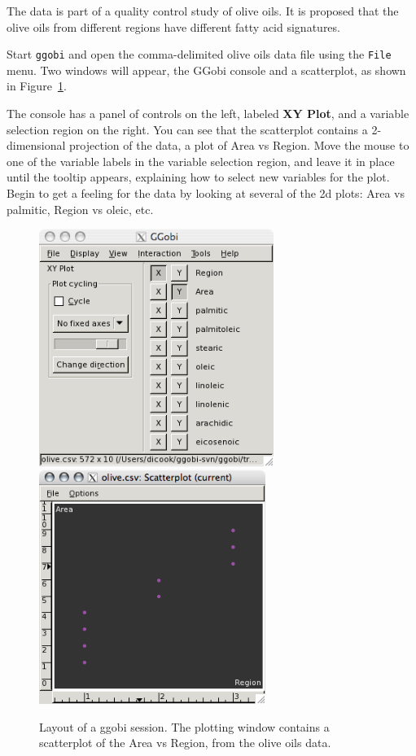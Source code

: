 \documentclass[11pt]{article}
\def\Widget#1{\textbf{#1}}
\begin{document}
The data is part of a quality control study of olive oils. It is proposed
that the olive oils from different regions have different fatty acid
signatures.

Start {\tt ggobi} and open the comma-delimited olive oils data file
using the {\tt File} menu.
Two windows will appear, the GGobi console
and a scatterplot, as shown in Figure~\ref{fig1}.

The console has a panel of controls on the left, labeled
\Widget{XY Plot}, and a variable selection region on the right.  You
can see that the scatterplot contains a 2-dimensional projection of
the data, a plot of Area vs Region.  Move the mouse to one of the
variable labels in the variable selection region, and leave it in
place until the tooltip appears, explaining how to select new
variables for the plot.  Begin to get a feeling for the data by
looking at several of the 2d plots: Area vs palmitic, Region vs oleic,
etc.

\begin{figure}[h]
\centerline{\includegraphics[width=3in]{Figures/olive1.png}
  \includegraphics[width=2.9in]{Figures/olive2.png}
}
\caption{Layout of a ggobi session.  The plotting window contains a
scatterplot of the Area vs Region, from the olive oils data.
}%
\label{fig1}
\end{figure}
\end{document}
